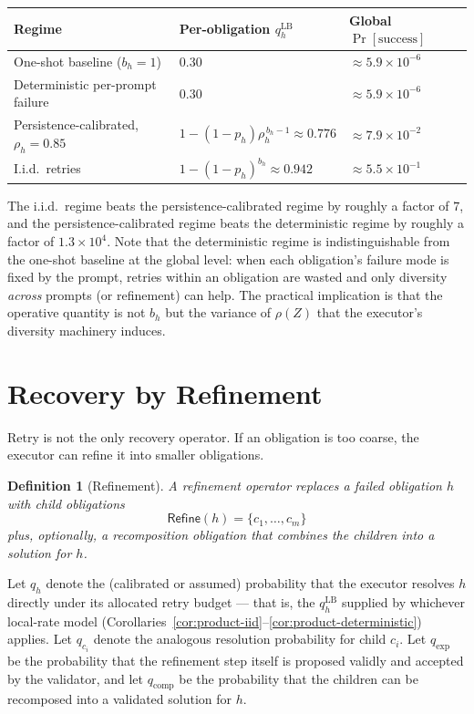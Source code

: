 \documentclass[11pt]{article}
\newtheorem{definition}{Definition}
\newcommand{\Refine}{\mathsf{Refine}}
\begin{document}
\begin{center}
\begin{tabular}{l l l}
\hline
Regime & Per-obligation $q_h^{\mathrm{LB}}$ & Global $\Pr[\text{success}]$ \\
\hline
One-shot baseline ($b_h=1$) & $0.30$ & $\approx 5.9 \times 10^{-6}$ \\
Deterministic per-prompt failure & $0.30$ & $\approx 5.9 \times 10^{-6}$ \\
Persistence-calibrated, $\rho_h=0.85$ & $1-(1-p_h)\rho_h^{\,b_h-1}\approx 0.776$ & $\approx 7.9 \times 10^{-2}$ \\
I.i.d.\ retries & $1-(1-p_h)^{b_h}\approx 0.942$ & $\approx 5.5 \times 10^{-1}$ \\
\hline
\end{tabular}
\end{center}

The i.i.d.\ regime beats the persistence-calibrated regime by roughly a
factor of $7$, and the persistence-calibrated regime beats the deterministic
regime by roughly a factor of $1.3\times 10^4$. Note that the deterministic
regime is indistinguishable from the one-shot baseline at the global level:
when each obligation's failure mode is fixed by the prompt, retries within
an obligation are wasted and only diversity \emph{across} prompts (or
refinement) can help. The practical implication is that the operative
quantity is not $b_h$ but the variance of $\rho(Z)$ that the executor's
diversity machinery induces.

\section{Recovery by Refinement}

Retry is not the only recovery operator. If an obligation is too coarse, the
executor can refine it into smaller obligations.

\begin{definition}[Refinement]
A refinement operator replaces a failed obligation $h$ with child obligations
\[
\Refine(h)=\{c_1,\ldots,c_m\}
\]
plus, optionally, a recomposition obligation that combines the children into a
solution for $h$.
\end{definition}

Let $q_h$ denote the (calibrated or assumed) probability that the executor
resolves $h$ directly under its allocated retry budget — that is, the
$q_h^{\mathrm{LB}}$ supplied by whichever local-rate model
(Corollaries~\ref{cor:product-iid}--\ref{cor:product-deterministic}) applies.
Let $q_{c_i}$ denote the analogous resolution probability for child $c_i$.
Let $q_{\mathrm{exp}}$ be the probability that the refinement step itself is
proposed validly and accepted by the validator, and let $q_{\mathrm{comp}}$
be the probability that the children can be recomposed into a validated
solution for $h$.
\end{document}

